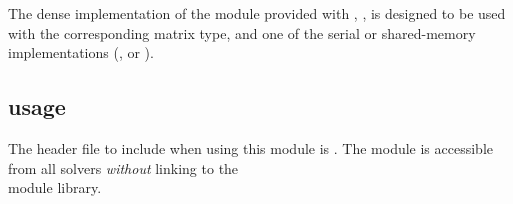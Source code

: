 
The dense implementation of the {\sunlinsol} module provided with
{\sundials}, {\sunlinsoldense}, is designed to be used with the
corresponding {\sunmatdense} matrix type, and one of the serial or
shared-memory {\nvector} implementations ({\nvecs}, {\nvecopenmp} or
{\nvecpthreads}).

\subsection{{\sunlinsoldense} usage}\label{ss:sunlinsol_dense_usage}

The header file to include when using this module 
is . The {\sunlinsoldense} module
is accessible from all {\sundials} solvers \textit{without}
linking to the \\ \noindent
{} module library.

